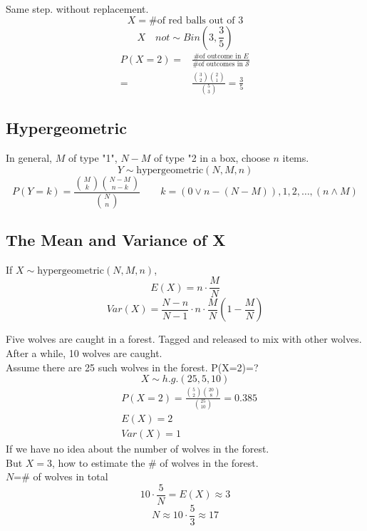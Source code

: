 \begin{exmp}
Same step. without replacement.
\[X= \text{\# of red balls out of 3}\]
\[X \quad  not \sim  Bin\left(3,\frac{3}{5}\right)\]
\begin{align*}
P(X=2)=& \frac{\text{\# of outcome in } E}{\text{\# of outcomes in } \mathcal{S}} \\
=& \frac{\binom 32 \binom 21}{\binom 53} =\frac{3}{5}
\end{align*}
\end{exmp}

\subsection{Hypergeometric}
\begin{prop}
In general, $M$ of type "1", $N-M$ of type "2 in a box, choose $n$ items.
\[Y \sim \text{hypergeometric}(N,M,n)\]
\[P(Y=k)=\frac{\binom Mk \binom {N-M}{n-k}}{\binom N n}\qquad k=(0 \vee n-(N-M)),1,2,\dots,(n \wedge M)\]
\end{prop}

\subsection{The Mean and Variance of X}
\begin{prop}
If $X \sim \text{hypergeometric}(N,M,n)$,
\[E(X)=n \cdot \frac{M}{N}\]
\[Var(X)=\frac{N-n}{N-1}\cdot n \cdot\frac{M}{N}\left(1-\frac{M}{N}\right)\]
\end{prop}


\begin{exmp}
Five wolves are caught in a forest. Tagged and released to mix with other wolves. After a while, 10 wolves are caught.\\
Assume there are 25 such wolves in the forest. P(X=2)=?
\[X \sim h.g.(25,5,10)\]
\begin{align*}
&P(X=2)=\frac{\binom 52 \binom {20}{8}}{\binom {25}{10}}=0.385 \\
&E(X)=2	\\
&Var(X)=1
\end{align*}
If we have no idea about the number of wolves in the forest.\\
But $X=3$, how to estimate the \# of wolves in the forest.\\
$N$=\# of wolves in total
\[10 \cdot \frac{5}{N}=E(X)\approx 3\]
\[N \approx 10 \cdot \frac{5}{3}\approx17\]
\end{exmp}



